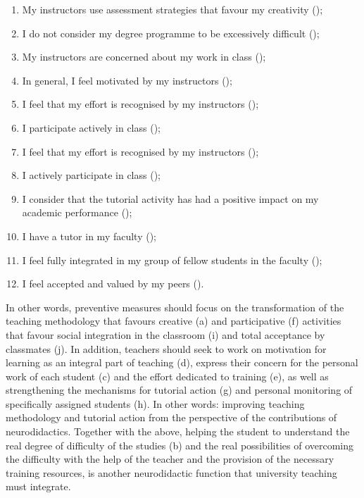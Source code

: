 \documentclass[english]{textolivre}
\begin{document}
\begin{enumerate}[label=\alph*.]
    \item My instructors use assessment strategies that favour my creativity ();
    \item I do not consider my degree programme to be excessively difficult ();
    \item My instructors are concerned about my work in class ();
    \item In general, I feel motivated by my instructors ();
    \item I feel that my effort is recognised by my instructors ();
    \item I participate actively in class ();
    \item I feel that my effort is recognised by my instructors ();
    \item I actively participate in class ();
    \item I consider that the tutorial activity has had a positive impact on my academic performance ();
    \item I have a tutor in my faculty ();
    \item I feel fully integrated in my group of fellow students in the faculty ();
    \item I feel accepted and valued by my peers ().
\end{enumerate}

In other words, preventive measures should focus on the transformation of the teaching methodology that favours creative (a) and participative (f) activities that favour social integration in the classroom (i) and total acceptance by classmates (j). In addition, teachers should seek to work on motivation for learning as an integral part of teaching (d), express their concern for the personal work of each student (c) and the effort dedicated to training (e), as well as strengthening the mechanisms for tutorial action (g) and personal monitoring of specifically assigned students (h). In other words: improving teaching methodology and tutorial action from the perspective of the contributions of neurodidactics. Together with the above, helping the student to understand the real degree of difficulty of the studies (b) and the real possibilities of overcoming the difficulty with the help of the teacher and the provision of the necessary training resources, is another neurodidactic function that university teaching must integrate.
\end{document}
